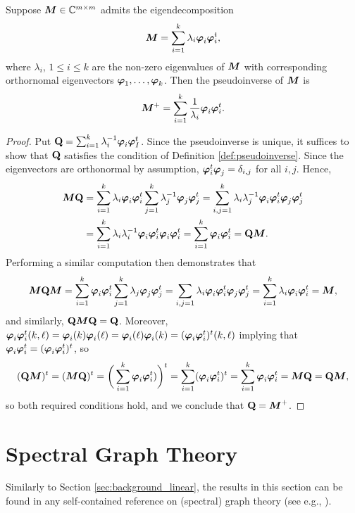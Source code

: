 \begin{lemma}
Suppose ${\vb*{M}}\in\mathbb{C}^{m\times m}$ admits the eigendecomposition 
\[{\vb*{M}}=\sum_{i=1}^k \lambda_i \vb*{\varphi}_i\vb*{\varphi}_i^t,\]
where $\lambda_i$, $1\leq i\leq k$ are the non-zero eigenvalues of ${\vb*{M}}$ with corresponding orthornomal eigenvectors $\vb*{\varphi}_1,\dots,\vb*{\varphi}_k$. Then the pseudoinverse of ${\vb*{M}}$ is 
\begin{equation}
    \label{eq:pseudoinverse}
    {\vb*{M}}^+=\sum_{i=1}^k \frac{1}{\lambda_i}\vb*{\varphi}_i\vb*{\varphi}_i^t.
\end{equation}
\end{lemma}
\begin{proof}
Put $\vb{Q}=\sum_{i=1}^k \lambda_i^{-1}\vb*{\varphi}_i\vb*{\varphi}_I^t$. Since the pseudoinverse is unique, it suffices to show that $\vb{Q}$ satisfies the condition of Definition \ref{def:pseudoinverse}.
Since the eigenvectors are orthonormal by assumption, $\vb*{\varphi}_i^t\vb*{\varphi}_j=\delta_{i,j}$ for all $i,j$. Hence,  
\begin{align*}
    {\vb*{M}}\vb{Q}&= \sum_{i=1}^k \lambda_i\vb*{\varphi}_i\vb*{\varphi}_i^t \sum_{j=1}^k \lambda_j^{-1}\vb*{\varphi}_j\vb*{\varphi}_j^t = \sum_{i,j=1}^k \lambda_i\lambda_j^{-1} \vb*{\varphi}_i\vb*{\varphi}_i^t \vb*{\varphi}_j\vb*{\varphi}_j^t \\
    &= \sum_{i=1}^k \lambda_i\lambda_i^{-1} \vb*{\varphi}_i\vb*{\varphi}_i^t\vb*{\varphi}_i\vb*{\varphi}_i^t 
    = \sum_{i=1}^k \vb*{\varphi}_i\vb*{\varphi}_i^t = \vb{Q}{\vb*{M}}.
\end{align*}
Performing a similar computation then demonstrates that 
\[{\vb*{M}}\vb{Q}{\vb*{M}} = \sum_{i=1}^k \vb*{\varphi}_i\vb*{\varphi}_i^t \sum_{j=1}^k \lambda_j\vb*{\varphi}_j\vb*{\varphi}_j^t=\sum_{i,j=1}\lambda_i \vb*{\varphi}_i\vb*{\varphi}_i^t\vb*{\varphi}_j\vb*{\varphi}_j^t=\sum_{i=1}^k \lambda_i \vb*{\varphi}_i\vb*{\varphi}_i^t ={\vb*{M}},\]
and similarly, $\vb{Q}{\vb*{M}}\vb{Q}=\vb{Q}$. Moreover, $\vb*{\varphi}_i\vb*{\varphi}_i^t (k,\ell)=\vb*{\varphi}_i(k)\vb*{\varphi}_i(\ell)=\vb*{\varphi}_i(\ell)\vb*{\varphi}_i(k)=(\vb*{\varphi}_i\vb*{\varphi}_i^t)^t (k,\ell)$ implying that $\vb*{\varphi}_i\vb*{\varphi}_i^t=(\vb*{\varphi}_i\vb*{\varphi}_i^t)^t$, so 
\[(\vb{Q}{\vb*{M}})^t=({\vb*{M}}\vb{Q})^t =\bigg(\sum_{i=1}^k \vb*{\varphi}_i\vb*{\varphi}_i^t )\bigg)^t = \sum_{i=1}^k (\vb*{\varphi}_i\vb*{\varphi}_i^t)^t = \sum_{i=1}^k \vb*{\varphi}_i\vb*{\varphi}_i^t={\vb*{M}}\vb{Q}=\vb{Q}{\vb*{M}},\]
so both required conditions hold, and we conclude that $\vb{Q}={\vb*{M}}^+$. 
\end{proof}



\section{Spectral Graph Theory}
\label{sec:background_spectral}

Similarly to  Section \ref{sec:background_linear}, the results in this section can be found in any self-contained reference on (spectral) graph theory (see e.g., \cite{spielman2009spectral,chung1997spectral}).

